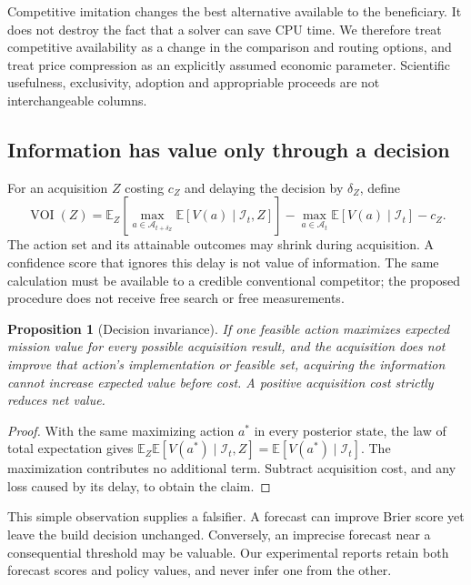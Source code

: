 \documentclass[11pt,a4paper]{article}
\newtheorem{proposition}{Proposition}
\begin{document}
Competitive imitation changes the best alternative available to the beneficiary. It does not destroy the fact that a solver can save CPU time. We therefore treat competitive availability as a change in the comparison and routing options, and treat price compression as an explicitly assumed economic parameter. Scientific usefulness, exclusivity, adoption and appropriable proceeds are not interchangeable columns.

\subsection{Information has value only through a decision}
For an acquisition $Z$ costing $c_Z$ and delaying the decision by $\delta_Z$, define
\begin{equation}
\operatorname{VOI}(Z)=\mathbb E_Z\!\left[\max_{a\in\mathcal A_{t+\delta_Z}}\mathbb E[V(a)\mid\mathcal I_t,Z]\right]
-\max_{a\in\mathcal A_t}\mathbb E[V(a)\mid\mathcal I_t]-c_Z.
\end{equation}
The action set and its attainable outcomes may shrink during acquisition. A confidence score that ignores this delay is not value of information. The same calculation must be available to a credible conventional competitor; the proposed procedure does not receive free search or free measurements.

\begin{proposition}[Decision invariance]
If one feasible action maximizes expected mission value for every possible acquisition result, and the acquisition does not improve that action's implementation or feasible set, acquiring the information cannot increase expected value before cost. A positive acquisition cost strictly reduces net value.
\end{proposition}
\begin{proof}
With the same maximizing action $a^*$ in every posterior state, the law of total expectation gives $\mathbb E_Z\mathbb E[V(a^*)\mid\mathcal I_t,Z]=\mathbb E[V(a^*)\mid\mathcal I_t]$. The maximization contributes no additional term. Subtract acquisition cost, and any loss caused by its delay, to obtain the claim.
\end{proof}

This simple observation supplies a falsifier. A forecast can improve Brier score yet leave the build decision unchanged. Conversely, an imprecise forecast near a consequential threshold may be valuable. Our experimental reports retain both forecast scores and policy values, and never infer one from the other.
\end{document}
